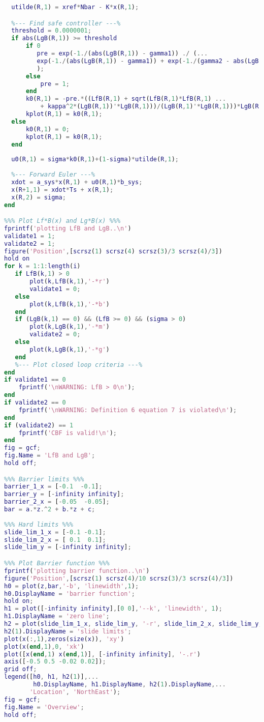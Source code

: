 \begin{lstlisting}[language=matlab]
  %-- Find controller by pole placement --%
  utilde(R,1) = xref*Nbar - K*x(R,1);

  %--- Find safe controller ---%
  threshold = 0.0000001;
  if abs(LgB(R,1)) >= threshold
      if 0
         pre = exp(-1./(abs(LgB(R,1)) - gamma1)) ./ (...
         exp(-1./(abs(LgB(R,1)) - gamma1)) + exp(-1./(gamma2 - abs(LgB(R,1)))) ...    
         );
      else 
          pre = 1;
      end
      k0(R,1) = -pre.*((LfB(R,1) + sqrt(LfB(R,1)*LfB(R,1) ...
          + kappa^2*(LgB(R,1))'*LgB(R,1)))/(LgB(R,1)'*LgB(R,1)))*LgB(R,1);
      kplot(R,1) = k0(R,1);
  else
      k0(R,1) = 0;
      kplot(R,1) = k0(R,1);
  end 
  
  u0(R,1) = sigma*k0(R,1)+(1-sigma)*utilde(R,1);
  
  %--- Forward Euler ---%
  xdot = a_sys*x(R,1) + u0(R,1)*b_sys;
  x(R+1,1) = xdot*Ts + x(R,1);
  x(R,2) = sigma;
end

%%% Plot Lf*B(x) and Lg*B(x) %%%
fprintf('plotting LfB and LgB..\n')
validate1 = 1;
validate2 = 1;
figure('Position',[scrsz(1) scrsz(4) scrsz(3)/3 scrsz(4)/3])
hold on
for k = 1:1:length(i)
   if LfB(k,1) > 0
       plot(k,LfB(k,1),'-*r')
       validate1 = 0;
   else
       plot(k,LfB(k,1),'-*b')
   end
   if (LgB(k,1) == 0) && (LfB >= 0) && (sigma > 0)
       plot(k,LgB(k,1),'-*m')
       validate2 = 0;
   else
       plot(k,LgB(k,1),'-*g')
   end
   %--- Plot closed loop criteria ---%  
end
if validate1 == 0
    fprintf('\nWARNING: LfB > 0\n');
end
if validate2 == 0
    fprintf('\nWARNING: Definition 6 equation 7 is violated\n');
end
if (validate2) == 1
    fprintf('CBF is valid!\n');
end
fig = gcf;
fig.Name = 'LfB and LgB';
hold off;

%%% Barrier limits %%%
barrier_1_x = [-0.1  -0.1];
barrier_y = [-infinity infinity];
barrier_2_x = [-0.05  -0.05];
bar = a.*z.^2 + b.*z + c;
    
%%% Hard limits %%%
slide_lim_1_x = [-0.1 -0.1];
slide_lim_2_x = [ 0.1  0.1];
slide_lim_y = [-infinity infinity]; 

%%% Plot Barrier function %%%
fprintf('plotting barrier function..\n')
figure('Position',[scrsz(1) scrsz(4)/10 scrsz(3)/3 scrsz(4)/3])
h0 = plot(z,bar,'-b', 'linewidth',1);
h0.DisplayName = 'barrier function';
hold on;
h1 = plot([-infinity infinity],[0 0],'--k', 'linewidth', 1);
h1.DisplayName = 'zero line';
h2 = plot(slide_lim_1_x, slide_lim_y, '-r', slide_lim_2_x, slide_lim_y, '-r');
h2(1).DisplayName = 'slide limits';
plot(x(:,1),zeros(size(x)), 'xy')
plot(x(end,1),0, 'xk')
plot([x(end,1) x(end,1)], [-infinity infinity], '-.r')
axis([-0.5 0.5 -0.02 0.02]);
grid off;
legend([h0, h1, h2(1)],...
        h0.DisplayName, h1.DisplayName, h2(1).DisplayName,...
       'Location', 'NorthEast');
fig = gcf;
fig.Name = 'Overview';
hold off;


\end{lstlisting}
